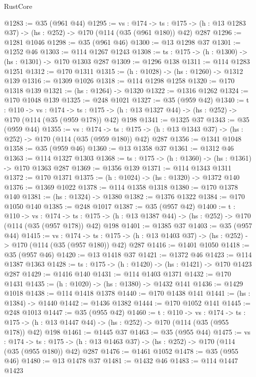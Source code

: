 \begin{lexlean}{RustCore}
\begin{coremodule}
@1283 := @35 (@961 @44)
@1295 := {vs : @174} ->
  {ts : @175} -> (h : @13 @1283 @37) -> (hs : @252) -> @170 (@114 (@35 (@961 @180)) @42) @287
@1296 := @1281 @1046
@1298 := @35 (@961 @46)
@1300 := @13 @1298 @37
@1301 := @1252 @46
@1303 := @114 @1267 @1243
@1308 := {ts : @175} -> (h : @1300) -> (hs : @1301) -> @170 @1303 @287
@1309 := @1296 @138
@1311 := @114 @1283 @1251
@1312 := @170 @1311
@1315 := (h : @1028) -> (hs : @1260) -> @1312 @139
@1316 := @1309 @1026
@1318 := @114 @1298 @1258
@1320 := @170 @1318 @139
@1321 := (hs : @1264) -> @1320
@1322 := @1316 @1262
@1324 := @170 @1048 @139
@1325 := @248 @1021
@1327 := @35 (@959 @42)
@1340 := {t : @110} ->
  {vs : @174} ->
  {ts : @175} -> (h : @13 @1327 @44) -> (hs : @252) -> @170 (@114 (@35 (@959 @178)) @42) @198
@1341 := @1325 @37
@1343 := @35 (@959 @44)
@1355 := {vs : @174} ->
  {ts : @175} -> (h : @13 @1343 @37) -> (hs : @252) -> @170 (@114 (@35 (@959 @180)) @42) @287
@1356 := @1341 @1048
@1358 := @35 (@959 @46)
@1360 := @13 @1358 @37
@1361 := @1312 @46
@1363 := @114 @1327 @1303
@1368 := {ts : @175} -> (h : @1360) -> (hs : @1361) -> @170 @1363 @287
@1369 := @1356 @139
@1371 := @114 @1343 @1311
@1372 := @170 @1371
@1375 := (h : @1024) -> (hs : @1320) -> @1372 @140
@1376 := @1369 @1022
@1378 := @114 @1358 @1318
@1380 := @170 @1378 @140
@1381 := (hs : @1324) -> @1380
@1382 := @1376 @1322
@1384 := @170 @1050 @140
@1385 := @248 @1017
@1387 := @35 (@957 @42)
@1400 := {t : @110} ->
  {vs : @174} ->
  {ts : @175} -> (h : @13 @1387 @44) -> (hs : @252) -> @170 (@114 (@35 (@957 @178)) @42) @198
@1401 := @1385 @37
@1403 := @35 (@957 @44)
@1415 := {vs : @174} ->
  {ts : @175} -> (h : @13 @1403 @37) -> (hs : @252) -> @170 (@114 (@35 (@957 @180)) @42) @287
@1416 := @1401 @1050
@1418 := @35 (@957 @46)
@1420 := @13 @1418 @37
@1421 := @1372 @46
@1423 := @114 @1387 @1363
@1428 := {ts : @175} -> (h : @1420) -> (hs : @1421) -> @170 @1423 @287
@1429 := @1416 @140
@1431 := @114 @1403 @1371
@1432 := @170 @1431
@1435 := (h : @1020) -> (hs : @1380) -> @1432 @141
@1436 := @1429 @1018
@1438 := @114 @1418 @1378
@1440 := @170 @1438 @141
@1441 := (hs : @1384) -> @1440
@1442 := @1436 @1382
@1444 := @170 @1052 @141
@1445 := @248 @1013
@1447 := @35 (@955 @42)
@1460 := {t : @110} ->
  {vs : @174} ->
  {ts : @175} -> (h : @13 @1447 @44) -> (hs : @252) -> @170 (@114 (@35 (@955 @178)) @42) @198
@1461 := @1445 @37
@1463 := @35 (@955 @44)
@1475 := {vs : @174} ->
  {ts : @175} -> (h : @13 @1463 @37) -> (hs : @252) -> @170 (@114 (@35 (@955 @180)) @42) @287
@1476 := @1461 @1052
@1478 := @35 (@955 @46)
@1480 := @13 @1478 @37
@1481 := @1432 @46
@1483 := @114 @1447 @1423

\end{coremodule}
\end{lexlean}
